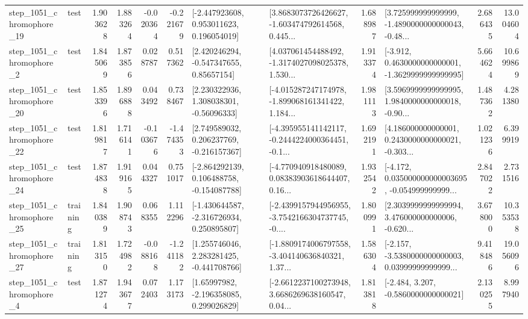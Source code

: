 \begin{tabular}{llrrrrllrlrr}
 step\_1051\_chromophore\_19 &      test &      1.903628 &    1.883264 &     -0.020364 & -0.221679 &    [-2.447923608, 0.953011623, 0.196054019] &  [3.8683073726426627, -1.603474792614568, 0.445... &       1.688987 &  [3.725999999999999, -1.4890000000000043, -0.48... &            2.686435 &         13.004604 \\
  step\_1051\_chromophore\_2 &      test &      1.845069 &    1.873856 &      0.028787 &  0.517362 &     [2.420246294, -0.547347655, 0.85657154] &  [4.037061454488492, -1.3174027098025378, 1.530... &       1.913374 &  [-3.912, 0.4630000000000001, -1.3629999999999995] &            5.664624 &         10.699869 \\
 step\_1051\_chromophore\_20 &      test &      1.853396 &    1.896888 &      0.043492 &  0.738467 &     [2.230322936, 1.308038301, -0.56096333] &  [-4.015287247174978, -1.899068161341422, 1.184... &       1.981113 &  [3.5969999999999995, 1.9840000000000018, -0.90... &            1.487362 &          4.281380 \\
 step\_1051\_chromophore\_22 &      test &      1.819817 &    1.716141 &     -0.103676 & -1.474353 &    [2.749589032, 0.206237769, -0.216157367] &  [-4.395955141142117, -0.2444224000364451, -0.1... &       1.692191 &  [4.186000000000001, 0.2430000000000021, -0.303... &            1.021236 &          6.399919 \\
 step\_1051\_chromophore\_24 &      test &      1.874838 &    1.919165 &      0.044327 &  0.751017 &   [-2.864292139, 0.106488758, -0.154087788] &  [-4.770940918480089, 0.08383903618644407, 0.16... &       1.932542 &  [-4.172, 0.035000000000003695, -0.054999999999... &            2.847022 &          2.731516 \\
 step\_1051\_chromophore\_25 &  training &      1.840389 &    1.908743 &      0.068355 &  1.112296 &   [-1.430644587, -2.316726934, 0.250895807] &  [-2.4399157944956955, -3.7542166304737745, -0.... &       1.800991 &  [2.3039999999999994, 3.476000000000006, -0.620... &            3.678000 &         10.353538 \\
 step\_1051\_chromophore\_27 &  training &      1.813150 &    1.724982 &     -0.088168 & -1.241182 &    [1.255746046, 2.283281425, -0.441708766] &  [-1.8809174006797558, -3.404140636840321, 1.37... &       1.586304 &  [-2.157, -3.5380000000000003, 0.03999999999999... &            9.418486 &         19.056096 \\
  step\_1051\_chromophore\_4 &      test &      1.871274 &    1.943677 &      0.072403 &  1.173173 &     [1.65997982, -2.196358085, 0.299026829] &  [-2.6612237100273948, 3.6686269638160547, 0.04... &       1.813818 &               [-2.484, 3.207, -0.5860000000000021] &            2.130255 &          8.997940 \\

\end{tabular}

